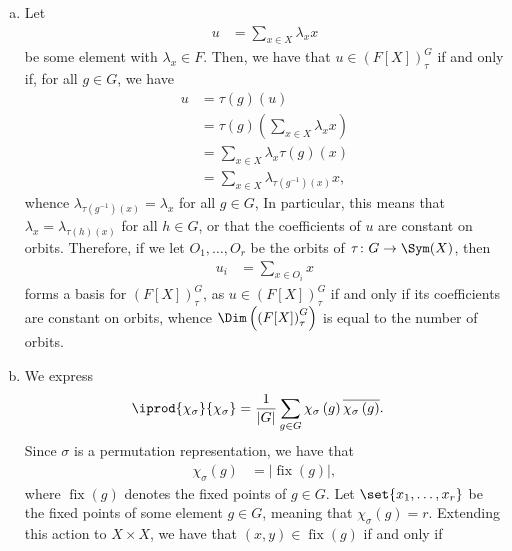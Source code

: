 \documentclass[10pt]{mypackage}
\begin{document}
\begin{solution}\hfill
  \begin{enumerate}[(a)]
    \item Let
      \begin{align*}
        u &= \sum_{x\in X} \lambda_x x
      \end{align*}
      be some element with $\lambda_x\in F$. Then, we have that $u\in \left( F[X] \right)_{\tau}^{G}$ if and only if, for all $g\in G$, we have
      \begin{align*}
        u &= \tau(g)(u)\\
          &= \tau(g)\left( \sum_{x\in X}\lambda_x x \right)\\
          &= \sum_{x\in X}\lambda_x \tau\left( g \right)(x)\\
          &= \sum_{x\in X} \lambda_{\tau\left( g^{-1} \right)(x)}x,
      \end{align*}
      whence $\lambda_{\tau\left( g^{-1} \right)(x)} = \lambda_x$ for all $g\in G$, In particular, this means that $\lambda_x = \lambda_{\tau\left( h \right)(x)}$ for all $h\in G$, or that the coefficients of $u$ are constant on orbits. Therefore, if we let $O_1,\dots,O_r$ be the orbits of $\tau\colon G\rightarrow \Sym(X)$, then 
      \begin{align*}
        u_i &= \sum_{x\in O_i} x
      \end{align*}
      forms a basis for $\left( F[X] \right)_{\tau}^{G}$, as $u\in \left( F[X] \right)_{\tau}^{G}$ if and only if its coefficients are constant on orbits, whence $\Dim\left( \left( F[X] \right)_{\tau}^{G} \right)$ is equal to the number of orbits.
    \item We express
      \begin{align*}
        \iprod{\chi_{\sigma}}{\chi_{\sigma}} &= \frac{1}{\left\vert G \right\vert}\sum_{g\in G} \chi_{\sigma}\left( g \right) \overline{\chi_{\sigma}\left(g\right)}.
      \end{align*}
      Since $\sigma$ is a permutation representation, we have that
      \begin{align*}
        \chi_{\sigma}\left( g \right) &= \left\vert \operatorname{fix}\left( g \right) \right\vert,
      \end{align*}
      where $\operatorname{fix}\left( g \right)$ denotes the fixed points of $g\in G$. Let $\set{x_1,\dots,x_r}$ be the fixed points of some element $g\in G$, meaning that $\chi_{\sigma}\left( g \right) = r$. Extending this action to $X\times X$, we have that $\left( x,y \right)\in \operatorname{fix}\left( g \right)$ if and only if

\end{enumerate}
\end{solution}
\end{document}
